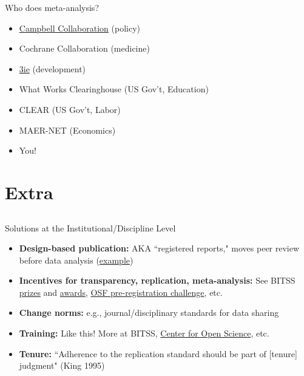 \documentclass[12pt, compress, handout]{beamer}
\let\noteitem\item %
\renewcommand{\item}{ 
	\noteitem\vspace{\fill}
	}
\begin{document}
		\begin{frame}{Who does meta-analysis?}
		\begin{itemize}
			\item \href{https://www.campbellcollaboration.org/}{Campbell Collaboration} (policy)
			\item Cochrane Collaboration (medicine)
			\item \href{http://www.3ieimpact.org/}{3ie} (development)
			\item What Works Clearinghouse (US Gov’t, Education) 
			\item CLEAR (US Gov’t, Labor)
			\item MAER-NET (Economics)
			\item You!
		\end{itemize}
	\end{frame}
	
\section{Extra}
\subsection{}

\begin{frame}{Solutions at the Institutional/Discipline Level}
	\begin{itemize}
		\item \textbf{Design-based publication:} AKA ``registered reports," moves peer review before data analysis (\href{https://osf.io/8mpji/wiki/home/}{example})
		\item \textbf{Incentives for transparency, replication, meta-analysis:} See BITSS \href{http://www.bitss.org/lr-prizes/}{prizes} and \href{http://www.bitss.org/ssmart-grants/}{awards}, \href{https://osf.io/prereg/}{OSF pre-registration challenge}, etc.
		\item \textbf{Change norms:} e.g., journal/disciplinary standards for data sharing
		\item \textbf{Training:} Like this! More at BITSS, \href{https://cos.io/our-services/training-services/}{Center for Open Science}, etc.  
		\item \textbf{Tenure:} ``Adherence to the replication standard should be part of [tenure] judgment" (King 1995)
	\end{itemize}
\end{frame}
\end{document}
